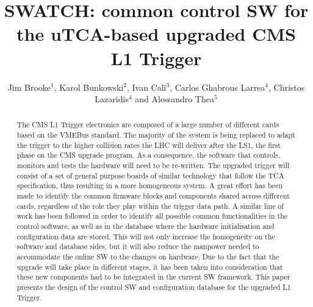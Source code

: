 \documentclass[a4paper]{jpconf}
\begin{document}
\title{SWATCH: common control SW for the uTCA-based upgraded CMS L1 Trigger}

\author{Jim Brooke$^1$, Karol Bunkowski$^2$, Ivan Cali$^3$, Carlos Ghabrous Larrea$^4$, Christos Lazaridis$^4$ and Alessandro Thea$^5$}

\address{$^1$ H.H. Wills Physics Laboratory, University of Bristol, U.K.}
\address{$^2$ Institute of Experimental Physics, University of Warsaw, Poland.}
\address{$^3$ Laboratory for Nuclear Science, Massachusetts Institute of Technology, U.S.A.}
\address{$^4$ Department of Physics, University of Wisconsin-Madison, U.S.A.}
\address{$^5$ Rutherford Appleton Laboratory, STFC, Harwell, U.K.}


\begin{abstract}
The CMS L1 Trigger electronics are composed of a large number of different cards based on the VMEBus standard. The majority of the system is being replaced to adapt the trigger to the higher collision rates the LHC will deliver after the LS1, the first phase on the CMS upgrade program. As a consequence, the software that controls, monitors and tests the hardware will need to be re-written. 
The upgraded trigger will consist of a set of general purpose boards of similar technology that follow the TCA specification, thus resulting in a more homogeneous system. A great effort has been made to identify the common firmware blocks and components shared across different cards, regardless of the role they play within the trigger data path. A similar line of work has been followed in order to identify all possible common functionalities in the control software, as well as in the database where the hardware initialisation and configuration data are stored. This will not only increase the homogeneity on the software and database sides, but it will also reduce the manpower needed to accommodate the online SW to the changes on hardware. Due to the fact that the upgrade will take place in different stages, it has been taken into consideration that these new components had to be integrated in the current SW framework. 
This paper presents the design of the control SW and configuration database for the upgraded L1 Trigger. 
\end{abstract}
\end{document}
